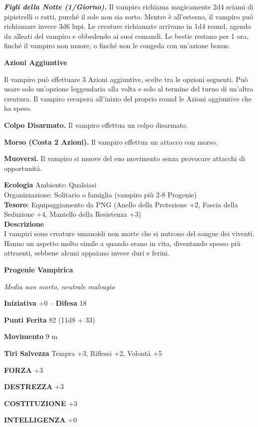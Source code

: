 \begin{multicols}{2}
\textit{\textbf{Figli della Notte (1/Giorno).}} Il vampiro richiama magicamente 2d4 sciami di pipistrelli o ratti, purché il sole non sia sorto. Mentre è all'esterno, il vampiro può richiamare invece 3d6 lupi. Le creature richiamate arrivano in 1d4 round, agendo da alleati del vampiro e obbedendo ai suoi comandi. Le bestie restano per 1 ora, finché il vampiro non muore, o finché non le congeda con un'azione bonus.

\textbf{Azioni Aggiuntive}

Il vampiro può effettuare 3 Azioni aggiuntive, scelte tra le opzioni seguenti. Può usare solo un'opzione leggendaria alla volta e solo al termine del turno di un'altra creatura. Il vampiro recupera all'inizio del proprio round le Azioni aggiuntive che ha speso.

\textbf{Colpo Disarmato.} Il vampiro effettua un colpo disarmato.

\textbf{Morso (Costa 2 Azioni).} Il vampiro effettua un attacco con morso.

\textbf{Muoversi.} Il vampiro si muove del suo movimento senza provocare attacchi di opportunità.

\textbf{Ecologia}
Ambiente: Qualsiasi\\
Organizzazione: Solitario o famiglia (vampiro più 2-8 Progenie)\\
\textbf{Tesoro}: Equipaggiamento da PNG (Anello della Protezione +2, Fascia della Seduzione +4, Mantello della Resistenza +3)\\
\textbf{Descrizione}\\
I vampiri sono creature umanoidi non morte che si nutrono del sangue dei viventi. Hanno un aspetto molto simile a quando erano in vita, diventando spesso più attraenti, sebbene alcuni appaiano invece duri e ferini.


\medskip{}\textbf{Progenie Vampirica}

\textit{Media non morto, neutrale malvagio}

\textbf{Iniziativa} +0 -- \textbf{Difesa} 18

\textbf{Punti Ferita} 82 (11d8 + 33)

\textbf{Movimento} 9 m

\textbf{Tiri Salvezza} Tempra +3, Riflessi +2, Volontà +5

\textbf{FORZA} +3

\textbf{DESTREZZA} +3

\textbf{COSTITUZIONE} +3

\textbf{INTELLIGENZA} +0


\end{multicols}
